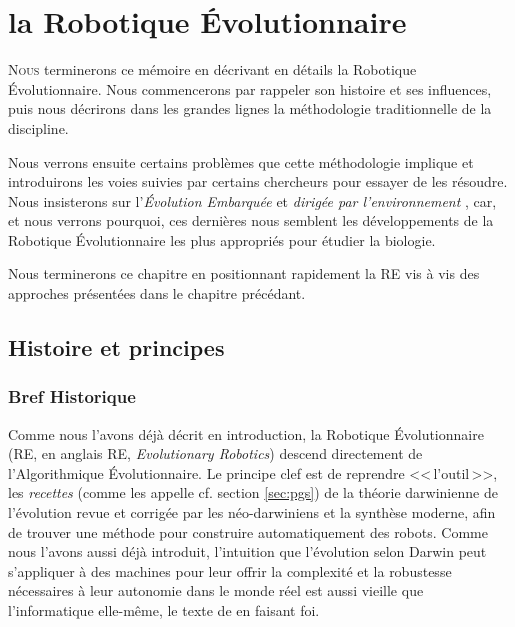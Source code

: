 
\chapter{la Robotique Évolutionnaire}\label{ch:RE}

\lettrine[lines=2]{N}{ous} terminerons ce mémoire en décrivant en détails la Robotique \'Evolutionnaire. Nous commencerons par rappeler son histoire et ses influences, puis nous décrirons dans les grandes lignes la méthodologie traditionnelle de la discipline.

Nous verrons ensuite certains problèmes que cette méthodologie implique et introduirons les voies suivies par certains chercheurs pour essayer de les résoudre. Nous insisterons sur l'\emph{\'Evolution Embarquée} \citep{watson02embodiedevolutiondistributingevolutionaryalgorithmpopulationrobots} et \emph{dirigée par l'environnement} \citep{bredeche2012environmentdrivendistributedevolutionaryadaptation}, car, et nous verrons pourquoi, ces dernières nous semblent les développements de la Robotique \'Evolutionnaire les plus appropriés pour étudier la biologie.

Nous terminerons ce chapitre en positionnant rapidement la RE vis à vis des approches présentées dans le chapitre précédant.


\section{Histoire et principes}\label{sec:re}
\subsection{Bref Historique}

Comme nous l'avons déjà décrit en introduction, la Robotique Évolutionnaire (RE, en anglais RE, \emph{Evolutionary Robotics}) descend directement de l'Algorithmique Évolutionnaire. Le principe clef est de reprendre <<\,l'outil\,>>, les \emph{recettes} (comme les appelle \cite{godfrey2009darwinian} cf. section \ref{sec:pgs}) de la théorie darwinienne de l'évolution revue et corrigée par les néo-darwiniens et la synthèse moderne, afin de trouver une méthode pour construire automatiquement des robots.
Comme nous l'avons aussi déjà introduit, l'intuition que l'évolution selon Darwin peut s'appliquer à des machines pour leur offrir la complexité et la robustesse nécessaires à leur autonomie dans le monde réel est aussi vieille que l'informatique elle-même, le texte de \cite{turing50computingmachineryintelligence} en faisant foi.

